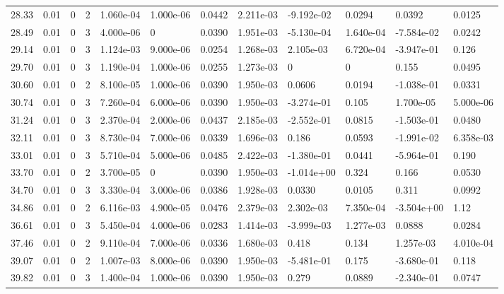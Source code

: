 \documentclass[preview]{standalone}
\begin{document}
{{{\begin{tabular}{L{1.2cm}C{1.2cm} C{0.3cm}C{0.5cm} C{1.4cm}C{1.4cm} C{1.4cm}C{1.4cm} C{1.6cm}C{1.6cm} C{1.6cm}C{1.6cm}}
  28.33  &  0.01  & 0     &  2 &  1.060e-04  & 1.000e-06  &  0.0442&   2.211e-03& -9.192e-02 & 0.0294   &  0.0392 & 0.0125  \\ 
  28.49  &  0.01  & 0     &  3 &  4.000e-06  & 0  &  0.0390&   1.951e-03& -5.130e-04 & 1.640e-04   &  -7.584e-02 & 0.0242  \\ 
  29.14  &  0.01  & 0     &  3 &  1.124e-03  & 9.000e-06  &  0.0254&   1.268e-03& 2.105e-03 & 6.720e-04   &  -3.947e-01 & 0.126  \\ 
  29.70  &  0.01  & 0     &  3 &  1.190e-04  & 1.000e-06  &  0.0255&   1.273e-03& 0 & 0   &  0.155 & 0.0495  \\ 
  30.60  &  0.01  & 0     &  2 &  8.100e-05  & 1.000e-06  &  0.0390&   1.950e-03& 0.0606 & 0.0194   &  -1.038e-01 & 0.0331  \\ 
  30.74  &  0.01  & 0     &  3 &  7.260e-04  & 6.000e-06  &  0.0390&   1.950e-03& -3.274e-01 & 0.105   &  1.700e-05 & 5.000e-06  \\ 
  31.24  &  0.01  & 0     &  3 &  2.370e-04  & 2.000e-06  &  0.0437&   2.185e-03& -2.552e-01 & 0.0815   &  -1.503e-01 & 0.0480  \\ 
  32.11  &  0.01  & 0     &  3 &  8.730e-04  & 7.000e-06  &  0.0339&   1.696e-03& 0.186 & 0.0593   &  -1.991e-02 & 6.358e-03  \\ 
  33.01  &  0.01  & 0     &  3 &  5.710e-04  & 5.000e-06  &  0.0485&   2.422e-03& -1.380e-01 & 0.0441   &  -5.964e-01 & 0.190  \\ 
  33.70  &  0.01  & 0     &  2 &  3.700e-05  & 0  &  0.0390&   1.950e-03& -1.014e+00 & 0.324   &  0.166 & 0.0530  \\ 
  34.70  &  0.01  & 0     &  3 &  3.330e-04  & 3.000e-06  &  0.0386&   1.928e-03& 0.0330 & 0.0105   &  0.311 & 0.0992  \\ 
  34.86  &  0.01  & 0     &  2 &  6.116e-03  & 4.900e-05  &  0.0476&   2.379e-03& 2.302e-03 & 7.350e-04   &  -3.504e+00 & 1.12  \\ 
  36.61  &  0.01  & 0     &  3 &  5.450e-04  & 4.000e-06  &  0.0283&   1.414e-03& -3.999e-03 & 1.277e-03   &  0.0888 & 0.0284  \\ 
  37.46  &  0.01  & 0     &  2 &  9.110e-04  & 7.000e-06  &  0.0336&   1.680e-03& 0.418 & 0.134   &  1.257e-03 & 4.010e-04  \\ 
  39.07  &  0.01  & 0     &  2 &  1.007e-03  & 8.000e-06  &  0.0390&   1.950e-03& -5.481e-01 & 0.175   &  -3.680e-01 & 0.118  \\ 
  39.82  &  0.01  & 0     &  3 &  1.400e-04  & 1.000e-06  &  0.0390&   1.950e-03& 0.279 & 0.0889   &  -2.340e-01 & 0.0747  \\ 

\end{tabular}}}}
\end{document}

